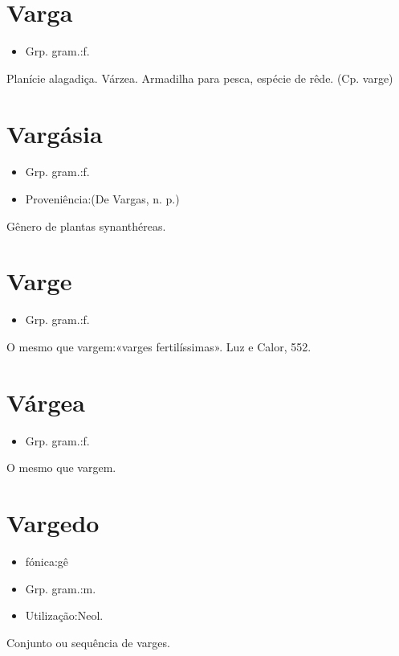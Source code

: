 \documentclass{article}
\begin{document}
\section{Varga}
\begin{itemize}
\item {Grp. gram.:f.}
\end{itemize}
Planície alagadiça.
Várzea.
Armadilha para pesca, espécie de rêde.
(Cp. \textunderscore varge\textunderscore )
\section{Vargásia}
\begin{itemize}
\item {Grp. gram.:f.}
\end{itemize}
\begin{itemize}
\item {Proveniência:(De \textunderscore Vargas\textunderscore , n. p.)}
\end{itemize}
Gênero de plantas synanthéreas.
\section{Varge}
\begin{itemize}
\item {Grp. gram.:f.}
\end{itemize}
O mesmo que \textunderscore vargem\textunderscore :«\textunderscore varges fertilíssimas\textunderscore ». \textunderscore Luz e Calor\textunderscore , 552.
\section{Várgea}
\begin{itemize}
\item {Grp. gram.:f.}
\end{itemize}
O mesmo que \textunderscore vargem\textunderscore .
\section{Vargedo}
\begin{itemize}
\item {fónica:gê}
\end{itemize}
\begin{itemize}
\item {Grp. gram.:m.}
\end{itemize}
\begin{itemize}
\item {Utilização:Neol.}
\end{itemize}
Conjunto ou sequência de varges.
\end{document}
